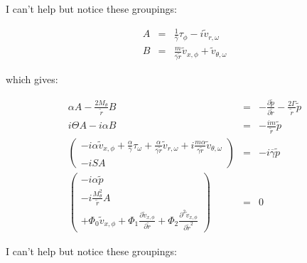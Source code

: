 \documentclass[12pt]{article}
\begin{document}
I can't help but notice these groupings:

\begin{eqnarray}
A &=& 
\frac{1}{\overline{\gamma}} \tau_{\phi}
-i \widetilde{v}_{r,\omega}
\nonumber
\\
B &=&
\frac{m}{\overline{\gamma} \widetilde{r}} \widetilde{v}_{x,\phi}
+ \widetilde{v}_{\theta,\omega}
\nonumber
\end{eqnarray}

which gives:

\begin{eqnarray}
\alpha A
-\frac{2 M_{\theta}}{\widetilde{r}} B 
&=&
-
\frac{\partial \widetilde{p} }{\partial \widetilde{r}} 
-
\frac{2 \Gamma}{\widetilde{r}} \widetilde{p}
\nonumber
\\
i \Theta A
-
i \alpha B
&=&
-\frac{i m }{\widetilde{r} } \widetilde{p}
\nonumber
\\
\left(
\begin{array}{r}
-i \alpha
\widetilde{v}_{x,\phi} 
+ 
\frac{\alpha}{\overline{\gamma}}
\tau_{\omega}
+
\frac{ \alpha }{\overline{\gamma}
\widetilde{r}}
 \widetilde{v}_{r,\omega}
+i 
 \frac{m \alpha}{\overline{\gamma} \widetilde{r}} \widetilde{v}_{\theta,\omega}
\\
-i
S A
\end{array}
\right)
&=&
-i \overline{\gamma} \widetilde{p}
\nonumber
\\
\left(
\begin{array}{r}
-i
\alpha
 \widetilde{p}
\\
-i
\frac{M_{\theta}^2}{\widetilde{r}}
A
\\
+ 
\Phi_0 
\widetilde{v}_{x,\phi}
+\Phi_1 
\frac{\partial
\widetilde{v}_{x,\phi}
}{\partial \widetilde{r}} 
+\Phi_2 
\frac{\partial^2
\widetilde{v}_{x,\phi}
}{\partial \widetilde{r}^2} 
\end{array}
\right)
&=&
0
\nonumber
\end{eqnarray}

I can't help but notice these groupings:
\end{document}
